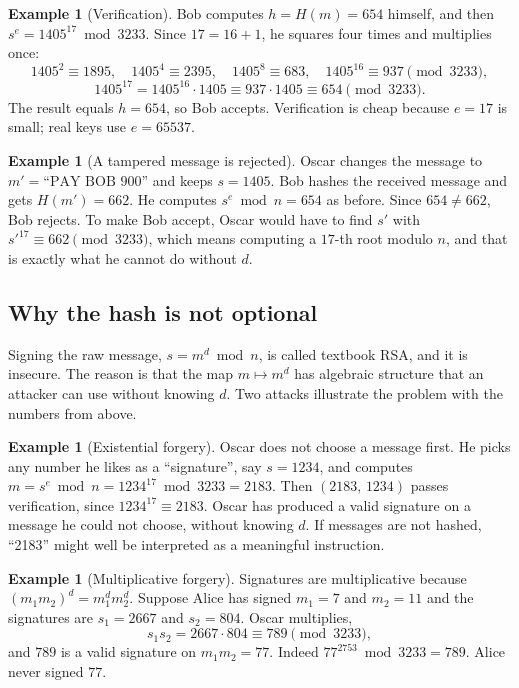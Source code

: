 \documentclass[11pt,a4paper]{article}
\theoremstyle{definition}
\newtheorem{example}[definition]{Example}
\newcommand{\Hash}{H}
\begin{document}
\begin{example}[Verification]\label{ex:rsaver}
Bob computes $h=\Hash(m)=654$ himself, and then $s^e=1405^{17} \bmod 3233$. Since $17=16+1$, he squares four times and multiplies once:
\[
1405^{2}\equiv 1895,\quad 1405^{4}\equiv 2395,\quad 1405^{8}\equiv 683,\quad 1405^{16}\equiv 937 \pmod{3233},
\]
\[
1405^{17} = 1405^{16}\cdot 1405 \equiv 937\cdot 1405 \equiv 654 \pmod{3233}.
\]
The result equals $h=654$, so Bob accepts. Verification is cheap because $e=17$ is small; real keys use $e=65537$.
\end{example}

\begin{example}[A tampered message is rejected]\label{ex:rsatamper}
Oscar changes the message to $m'=\text{``PAY BOB 900''}$ and keeps $s=1405$. Bob hashes the received message and gets $\Hash(m')=662$. He computes $s^e \bmod n = 654$ as before. Since $654\ne 662$, Bob rejects. To make Bob accept, Oscar would have to find $s'$ with $s'^{17}\equiv 662 \pmod{3233}$, which means computing a $17$-th root modulo $n$, and that is exactly what he cannot do without $d$.
\end{example}

\subsection{Why the hash is not optional}

Signing the raw message, $s=m^d \bmod n$, is called textbook RSA, and it is insecure. The reason is that the map $m\mapsto m^d$ has algebraic structure that an attacker can use without knowing $d$. Two attacks illustrate the problem with the numbers from above.

\begin{example}[Existential forgery]\label{ex:rsaforge}
Oscar does not choose a message first. He picks any number he likes as a ``signature'', say $s=1234$, and computes $m = s^e \bmod n = 1234^{17} \bmod 3233 = 2183$. Then $(2183,\,1234)$ passes verification, since $1234^{17}\equiv 2183$. Oscar has produced a valid signature on a message he could not choose, without knowing $d$. If messages are not hashed, ``2183'' might well be interpreted as a meaningful instruction.
\end{example}

\begin{example}[Multiplicative forgery]\label{ex:rsamult}
Signatures are multiplicative because $(m_1 m_2)^d = m_1^d m_2^d$. Suppose Alice has signed $m_1=7$ and $m_2=11$ and the signatures are $s_1=2667$ and $s_2=804$. Oscar multiplies,
\[
s_1 s_2 = 2667\cdot 804 \equiv 789 \pmod{3233},
\]
and $789$ is a valid signature on $m_1m_2=77$. Indeed $77^{2753} \bmod 3233 = 789$. Alice never signed $77$.
\end{example}
\end{document}
